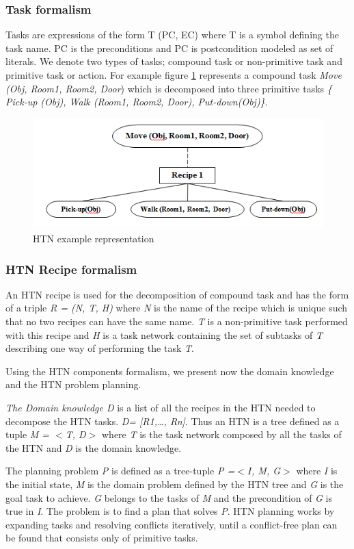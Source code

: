 \subsubsection{Task formalism}
Tasks are expressions of the form T (PC, EC) where T is a symbol defining the task name. PC is the preconditions and PC is postcondition modeled as set of literals. We denote two types of tasks; compound task or non-primitive task and primitive task or action. For example figure \ref{HTN example representation} represents a compound task \textit{Move (Obj, Room1, Room2, Door}) which is decomposed into three primitive tasks \textit{\{ Pick-up (Obj), Walk (Room1, Room2, Door), Put-down(Obj)\}}.

\begin{figure}[h]
	\centering
	\includegraphics [width=.75\columnwidth]{Pictures/example.png}
	\caption{\label{HTN example representation} HTN example representation}
\end{figure}

\subsubsection{HTN Recipe formalism}
An HTN recipe is used for the decomposition of compound task and has the form of a triple \textit{R = (N, T, H)} where \textit{N} is the name of the recipe which is unique such that no two recipes can have the same name. \textit{T} is a non-primitive task performed with this recipe and \textit{H} is a task network containing the set of subtasks of \textit{T}  describing one way of performing the task \textit{T}.


Using the HTN components formalism, we present now the domain knowledge and the HTN problem planning.

\textit{The Domain knowledge D} is a list of all the recipes in the HTN needed to decompose the HTN tasks. \textit{D= [R1,…, Rn]}. Thus an HTN is a tree defined as a tuple \textit{M = $<$T, D$>$} where \textit{T} is the task network composed by all the tasks of the HTN and \textit{ D } is the domain knowledge. 

The planning problem \textit{P} is defined as a tree-tuple\textit{ P =$<I$, M, G$>$} where\textit{ I} is the initial state, \textit{M} is the domain problem defined by the HTN tree and \textit{G} is the goal task to achieve. \textit{G} belongs to the tasks of \textit{M} and the precondition of \textit{G }is true in \textit{I}. The problem is to find a plan that solves \textit{P}. HTN planning works by expanding tasks and resolving conflicts iteratively, until a conflict-free plan can be found that consists only of primitive tasks.


